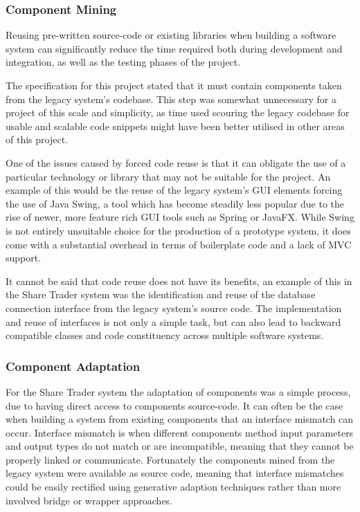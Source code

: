 \documentclass[12pt, a4paper,titlepage]{article}
\begin{document}
\subsubsection{Component Mining}
Reusing pre-written source-code or existing libraries when building a software
system can significantly reduce the time required both during development
and integration, as well as the testing phases of the project.

The specification for this project stated that it must contain components
taken from the legacy system’s codebase. 
This step was somewhat unnecessary for a project of this scale and simplicity,
as time used scouring the legacy codebase for usable and scalable code
snippets might have been better utilised in other areas of this project.

One of the issues caused by forced code reuse is that it can obligate the use
of a particular technology or library that may not be suitable for the
project. 
An example of this would be the reuse of the legacy system’s GUI elements
forcing the use of Java Swing, a tool which has become steadily less popular
due to the rise of newer, more feature rich GUI tools such as Spring or
JavaFX. 
While Swing is not entirely unsuitable choice for the production of a
prototype system, it does come with a substantial overhead in terms of
boilerplate code and a lack of MVC support.

It cannot be said that code reuse does not have its benefits, an example of
this in the Share Trader system was the identification and reuse of the
database connection interface from the legacy system’s source code. 
The implementation and reuse of interfaces is not only a simple task, but can
also lead to backward compatible classes and code constituency across multiple
software systems.

\subsubsection{Component Adaptation}
For the Share Trader system the adaptation of components was a simple process,
due to having direct access to components source-code. 
It can often be the case when building a system from existing components that
an interface mismatch can occur. 
Interface mismatch is when different components method input parameters and
output types do not match or are incompatible, meaning that they cannot be
properly linked or communicate.  
Fortunately the components mined from the legacy system were available as
source code, meaning that interface mismatches could be easily rectified
using generative adaption techniques rather than more involved bridge or
wrapper approaches.
\end{document}
